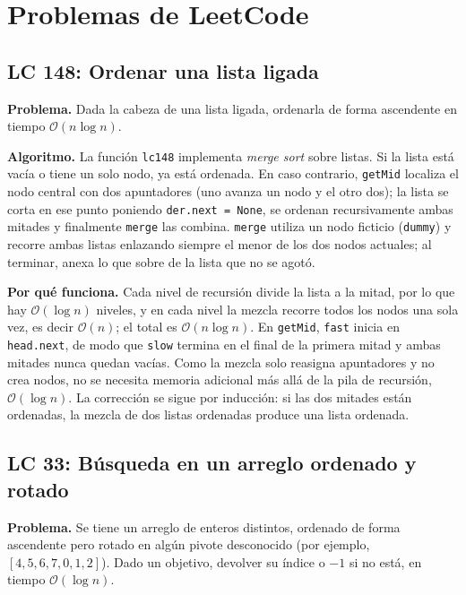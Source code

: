 \documentclass[11pt,letterpaper]{article}
\newcommand{\bigO}[1]{\ensuremath{\mathcal{O}(#1)}}
\begin{document}
\section{Problemas de LeetCode}

\subsection{LC 148: Ordenar una lista ligada}

\textbf{Problema.} Dada la cabeza de una lista ligada, ordenarla de forma ascendente en tiempo \bigO{n \log n}.

\textbf{Algoritmo.} La función \texttt{lc148} implementa \emph{merge sort} sobre listas. Si la lista está vacía o tiene un solo nodo, ya está ordenada. En caso contrario, \texttt{getMid} localiza el nodo central con dos apuntadores (uno avanza un nodo y el otro dos); la lista se corta en ese punto poniendo \texttt{der.next = None}, se ordenan recursivamente ambas mitades y finalmente \texttt{merge} las combina. \texttt{merge} utiliza un nodo ficticio (\texttt{dummy}) y recorre ambas listas enlazando siempre el menor de los dos nodos actuales; al terminar, anexa lo que sobre de la lista que no se agotó.

\textbf{Por qué funciona.} Cada nivel de recursión divide la lista a la mitad, por lo que hay \bigO{\log n} niveles, y en cada nivel la mezcla recorre todos los nodos una sola vez, es decir \bigO{n}; el total es \bigO{n \log n}. En \texttt{getMid}, \texttt{fast} inicia en \texttt{head.next}, de modo que \texttt{slow} termina en el final de la primera mitad y ambas mitades nunca quedan vacías. Como la mezcla solo reasigna apuntadores y no crea nodos, no se necesita memoria adicional más allá de la pila de recursión, \bigO{\log n}. La corrección se sigue por inducción: si las dos mitades están ordenadas, la mezcla de dos listas ordenadas produce una lista ordenada.

\subsection{LC 33: Búsqueda en un arreglo ordenado y rotado}

\textbf{Problema.} Se tiene un arreglo de enteros distintos, ordenado de forma ascendente pero rotado en algún pivote desconocido (por ejemplo, $[4,5,6,7,0,1,2]$). Dado un objetivo, devolver su índice o $-1$ si no está, en tiempo \bigO{\log n}.
\end{document}
